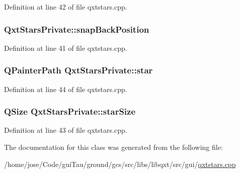 Definition at line 42 of file qxtstars.\-cpp.

\hypertarget{class_qxt_stars_private_a2a94d55f6a148d3cc66f75cd809022cf}{
\subsubsection[{snap\-Back\-Position}]{ Qxt\-Stars\-Private\-::snap\-Back\-Position}}\label{class_qxt_stars_private_a2a94d55f6a148d3cc66f75cd809022cf}


Definition at line 41 of file qxtstars.\-cpp.

\hypertarget{class_qxt_stars_private_a009ed2c586b4fb21bf32f53dcfd492ee}{
\subsubsection[{star}]{\setlength{\rightskip}{0pt plus 5cm}Q\-Painter\-Path Qxt\-Stars\-Private\-::star}}\label{class_qxt_stars_private_a009ed2c586b4fb21bf32f53dcfd492ee}


Definition at line 44 of file qxtstars.\-cpp.

\hypertarget{class_qxt_stars_private_ae0883c539a5ef78957b5ca48200e926b}{
\subsubsection[{star\-Size}]{\setlength{\rightskip}{0pt plus 5cm}Q\-Size Qxt\-Stars\-Private\-::star\-Size}}\label{class_qxt_stars_private_ae0883c539a5ef78957b5ca48200e926b}


Definition at line 43 of file qxtstars.\-cpp.



The documentation for this class was generated from the following file\-:\begin{DoxyCompactItemize}
\item 
/home/jose/\-Code/gui\-Tau/ground/gcs/src/libs/libqxt/src/gui/\hyperlink{qxtstars_8cpp}{qxtstars.\-cpp}\end{DoxyCompactItemize}
